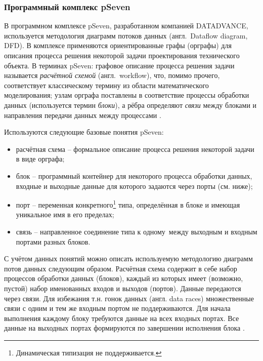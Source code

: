 \subsubsection{Программный комплекс pSeven}

В программном комплексе \textsf{pSeven}, разработанном компанией DATADVANCE, используется методология диаграмм потоков данных (англ.~Dataflow diagram, DFD). В комплексе применяются ориентированные графы (орграфы) для описания процесса решения некоторой задачи проектирования технического объекта. В терминах \textsf{pSeven}: графовое описание процесса решения задачи называется \textit{расчётной схемой} (англ.~workflow), что, помимо прочего, соответствует классическому термину из области математического моделирования; узлам орграфа поставлены в соответствие процессы обработки данных (используется термин \textit{блоки}), а рёбра определяют \textit{связи} между блоками и направления передачи данных между процессами \cite{Nazarenko2015}.

Используются следующие базовые понятия \textsf{pSeven}:
\begin{itemize}
    \item \textsf{расчётная схема} -- формальное описание процесса решения некоторой задачи в виде орграфа;
    \item \textsf{блок} -- программный контейнер для некоторого процесса обработки данных, входные и выходные данные для которого задаются через порты (см. ниже);
    \item \textsf{порт} -- переменная конкретного\footnote{Динамическая типизация не поддерживается.} типа, определённая в блоке и имеющая уникальное имя в его пределах;
    \item \textsf{связь} -- направленное соединение типа  к одному\frqq\ между выходным и входным портами разных блоков.
\end{itemize}

С учётом данных понятий можно описать используемую методологию диаграмм потов данных следующим образом. Расчётная схема содержит в себе набор процессов обработки данных (блоков), каждый из которых имеет (возможно, пустой) набор именованных входов и выходов (портов). Данные передаются через связи. Для избежания т.н. гонок данных (англ. data races) множественные связи с одним и тем же входным портом не поддерживаются. Для начала выполнения каждому блоку требуются данные на всех входных портах. Все данные на выходных портах формируются по завершении исполнения блока \cite{Nazarenko2015}.

